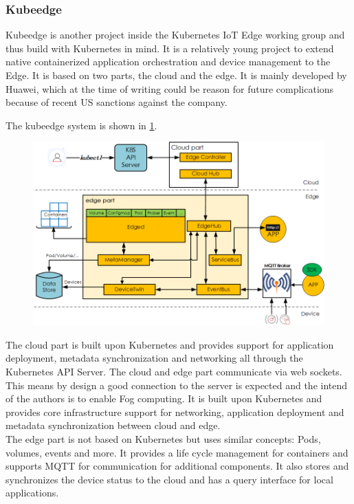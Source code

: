 \subsubsection{Kubeedge}
Kubeedge is another project inside the Kubernetes IoT Edge working group and thus build with Kubernetes in mind. It is a relatively young project to extend native containerized application orchestration and device management to the Edge. It is based on two parts, the cloud and the edge. It is mainly developed by Huawei, which at the time of writing could be reason for future complications because of recent US sanctions against the company.

The kubeedge system is shown in \cref{fig:kubeedgeStruct}.
\begin{figure}[!ht]
    \centering
    \includegraphics[width=\textwidth-1cm]{figures/kubeedge_arch.png}
    \label{fig:kubeedgeStruct}
\end{figure}

The cloud part is built upon Kubernetes and provides support for application deployment, metadata synchronization and networking all through the Kubernetes API Server. The cloud and edge part communicate via web sockets. This means by design a good connection to the server is expected and the intend of the authors is to enable Fog computing. It is built upon Kubernetes and provides core infrastructure support for networking, application deployment and metadata synchronization between cloud and edge.\\
The edge part is not based on Kubernetes but uses similar concepts: Pods, volumes, events and more. It provides a life cycle management for containers and supports MQTT for communication for additional components. It also stores and synchronizes the device status to the cloud and has a query interface for local applications.

